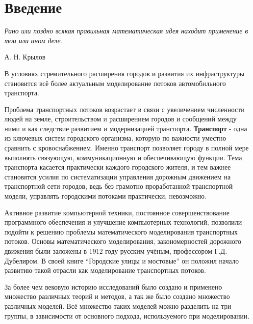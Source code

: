 \documentclass[12pt, a4paper]{extarticle}
\numberwithin{equation}{section}
\begin{document}
\justify 
\setlength{\parindent}{1.25cm} 
\newpage 
\thispagestyle{empty} 
\setcounter{page}{2} 

\newpage

\setcounter{page}{2}

\tableofcontents 
\newpage 

\section*{Введение}
\epigraph{\textit{Рано или поздно всякая правильная математическая идея находит применение в тои или ином деле.}}
{А. Н. Крылов}
В условиях стремительного расширения городов и развития их инфраструктуры становится всё более актуальным моделирование потоков автомобильного транспорта. 

Проблема транспортных потоков возрастает в связи с увеличением численности людей на земле, строительством и расширением городов и сообщений между ними и как следствие развитием и модернизацией транспорта.  \textbf{Транспорт} - одна из ключевых систем городского организма, которую по важности уместно сравнить с кровоснабжением. Именно транспорт позволяет городу в полной мере выполнять связующую, коммуникационную и обеспечивающую функции. Тема транспорта касается практически каждого городского жителя, и тем важнее становятся усилия по систематизации управления дорожным движением на транспортной сети городов, ведь без грамотно проработанной транспортной модели, управлять городскими потоками практически, невозможно. 

Активное развитие компьютерной техники, постоянное совершенствование программного обеспечения и улучшение компьютерных технологий, позволили подойти к решению проблемы математического моделирования транспортных потоков. Основы математического моделирования, закономерностей дорожного движения были заложены в 1912 году русским учёным, профессором Г.Д. Дубелиром. В своей книге ``Городские улицы и мостовые'' \cite{Street} он положил начало развитию такой отрасли как моделирование транспортных потоков.

За более чем вековую историю исследований было создано и применено множество различных теорий и методов, а так же было создано множество различных моделей. Всё множество таких моделей можно разделить на три группы, в зависимости от основного подхода, используемого при моделировании.
\end{document}
